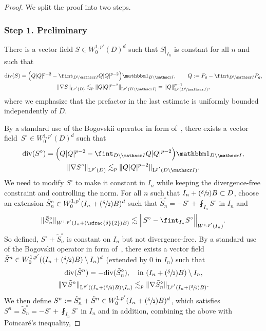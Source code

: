 \documentclass[10pt]{amsart}
\let\mathcal\mathscr
\newcommand{\Psfrac}[2]{(\sfrac{#1}{#2})}
\let\mathds\mathbbm
\theoremstyle{plain}
\theoremstyle{definition}
\newcommand{\Ic}{\mathcal I}
\newcommand{\Ld}{\operatorname{L}}
\newcommand{\Div}{{\operatorname{div}}}
\newcommand{\step}[1]{\subsubsection*{Step #1}}
\begin{document}
\begin{proof}
We split the proof into two steps.

\step{1. Preliminary} There is a vector field $S\in W^{1,p'}_0(D)^d$ such that $S|_{I_{n}}$ is constant for all $n$ and such that
\begin{gather*}
\Div(S)=\Big(Q|Q|^{p-2}-\fint_{D\setminus\Ic}Q|Q|^{p-2}\Big)\mathds1_{D\setminus\Ic},
\qquad Q:=P_g-\fint_{D\setminus\Ic}P_g,\\
\|\nabla S\|_{\Ld^{p'}(D)}\lesssim_p \|Q|Q|^{p-2}\|_{\Ld^{p'}(D\setminus\Ic)}=\|Q\|_{\Ld^p(D\setminus\Ic)}^{p-1},
\end{gather*}
where we emphasize that the prefactor in the last estimate is uniformly bounded independently of $D$.

By a standard use of the Bogovskii operator in form of~\cite[Th.\,III.3.1]{Galdi}, there exists a vector field~$S^\circ\in W^{1,p'}_0(D)^d$ such that
\begin{gather*}
\Div(S^\circ)=\Big(Q|Q|^{p-2}-\fint_{D\setminus\Ic}Q|Q|^{p-2}\Big)\mathds1_{D\setminus\Ic},\\
\|\nabla S^\circ\|_{\Ld^{p'}(D)}\lesssim_p \|Q|Q|^{p-2}\|_{\Ld^{p'}(D\setminus\Ic)}.
\end{gather*}
We need to modify $S^\circ$ to make it constant in $I_n$ while keeping the divergence-free constraint and controlling the norm.
For all $n$ such that $I_n+\Psfrac\delta2 B \subset D$, choose an extension $\tilde S^\circ_n\in W_0^{1,p'}(I_n+\Psfrac\delta2 B)^d$ such that $\tilde S^\circ_n=-S^\circ+\fint_{I_n}S^\circ$ in $I_n$ and
\[ \|\tilde S^\circ_n\|_{W^{1,p'}(I_n+\Psfrac\delta2 B)}\lesssim \Big\|S^\circ-\fint_{I_n}S^\circ\Big\|_{W^{1,p'}(I_n)}.\]
So defined, $S^\circ+\tilde S^\circ_n$ is constant on $I_n$ but not divergence-free.
By a standard use of the Bogovskii operator in form of~\cite[Th.\,III.3.1]{Galdi}, there exists a vector field $\tilde S^n\in W^{1,p'}_0((I_n+\Psfrac\delta2 B)\setminus I_n)^d$ (extended by 0 in $I_n$) such that
\begin{gather*}
\Div(\tilde S^n)=-\Div(\tilde S_n^\circ),\quad \text{in }(I_n+\Psfrac\delta2 B)\setminus I_n,\\
\|\nabla\tilde S^n\|_{\Ld^{p'}((I_n+\Psfrac\delta2 B)\setminus I_n)}\lesssim_p \|\nabla \tilde S_n^\circ\|_{\Ld^{p'}(I_n+\Psfrac\delta2 B)}.
\end{gather*}
We then define $S^n:=\tilde S^\circ_n+\tilde S^n\in W^{1,p'}_0(I_n+\Psfrac\delta2 B)^d$, which satisfies $S^n=\tilde S^\circ_n=-S^\circ+\fint_{I_n}S^\circ$ in $I_n$ and in addition, combining the above with Poincaré's inequality,

\end{proof}
\end{document}
